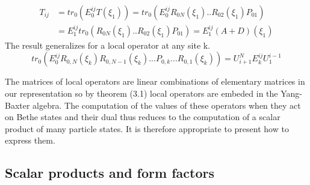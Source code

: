 \documentclass[12pt]{article}
\begin{document}
\begin{align}
T_{ij} &=tr_{0}(E_{0}^{ij}T(\xi_{1}))=tr_{0}(E_{0}^{ij}R_{0N}(\xi_{1})..R_{02}(\xi_{1})P_{01})\\ 
       &=E_{1}^{ij}tr_{0}(R_{0N}(\xi_{1})..R_{02}(\xi_{1})P_{01})=E_{1}^{ij}(A+D)(\xi_{1})
\end{align}
The result generalizes for a local operator at any site k.
\begin{equation}
tr_{0}(E_{0}^{ij}R_{0,N}(\xi_{k})R_{0,N-1}(\xi_{k})...P_{0,k}...R_{0,1}(\xi_{k}))=U_{i+1}^{N}E_{k}^{ij}U_{1}^{i-1}
\end{equation} 
 
The matrices of local operators are linear combinations of elementary matrices in our representation so by theorem (3.1) local operators are embeded in the Yang-Baxter algebra. The computation of the values ​​of these operators when they act on Bethe states and their dual thus reduces to the computation of a scalar product of many particle states. It is therefore appropriate to present how to express them.

\subsection{Scalar products and form factors} 
 
\end{document}

